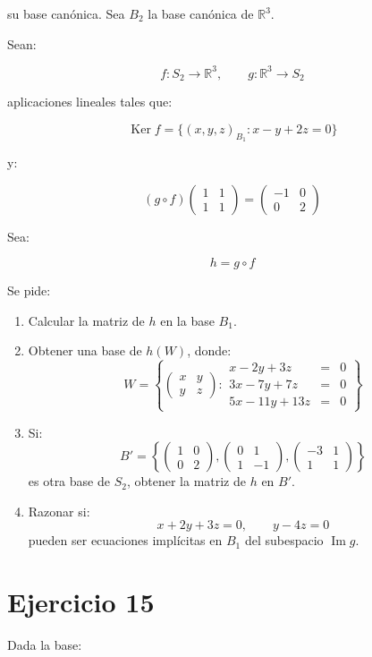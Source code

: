 \documentclass[11pt,a4paper]{article}
\newcommand{\R}{\mathbb{R}}
\newcommand{\Ker}{\operatorname{Ker}}
\newcommand{\Ima}{\operatorname{Im}}
\begin{document}
su base canónica. Sea $B_2$ la base canónica de $\R^3$.

Sean:

\[
f:S_2\longrightarrow\R^3,
\qquad
g:\R^3\longrightarrow S_2
\]

aplicaciones lineales tales que:

\[
\Ker f=
\{(x,y,z)_{B_1}:x-y+2z=0\}
\]

y:

\[
(g\circ f)
\begin{pmatrix}
1&1\\
1&1
\end{pmatrix}
=
\begin{pmatrix}
-1&0\\
0&2
\end{pmatrix}
\]

Sea:

\[
h=g\circ f
\]

Se pide:

\begin{enumerate}[label=\alph*)]
	\item Calcular la matriz de $h$ en la base $B_1$.
	\item Obtener una base de $h(W)$, donde:
	\[
	W=
	\left\{
	\begin{pmatrix}
	x&y\\
	y&z
	\end{pmatrix}:
	\begin{array}{rcl}
	x-2y+3z&=&0\\
	3x-7y+7z&=&0\\
	5x-11y+13z&=&0
	\end{array}
	\right\}
	\]
	\item Si:
	\[
	B'=
	\left\{
	\begin{pmatrix}1&0\\0&2\end{pmatrix},
	\begin{pmatrix}0&1\\1&-1\end{pmatrix},
	\begin{pmatrix}-3&1\\1&1\end{pmatrix}
	\right\}
	\]
	es otra base de $S_2$, obtener la matriz de $h$ en $B'$.
	\item Razonar si:
	\[
	x+2y+3z=0,
	\qquad
	y-4z=0
	\]
	pueden ser ecuaciones implícitas en $B_1$ del subespacio $\Ima g$.
\end{enumerate}

\section{Ejercicio 15}
Dada la base:
\end{document}

